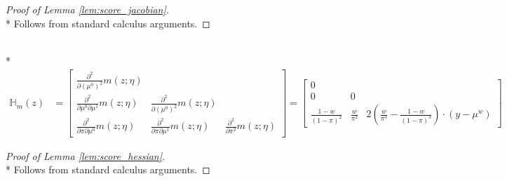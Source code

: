 \begin{proof}[Proof of Lemma \ref{lem:score_jacobian}]\mbox{}\\*
    Follows from standard calculus arguments.
\end{proof}

\begin{boxD}
    \begin{lem}\label{lem:score_hessian}\mbox{}\\*
    \begin{equation}
        \begin{aligned}
            \mathbb{H}_{m}(z)
            & = \begin{bmatrix}
                \frac{\partial^2}{\partial \left(\mu^{0}\right)^2} m\left(z; \eta\right)   & & \\
                \frac{\partial^2}{\partial \mu^{0} \partial \mu^{1}} m\left(z; \eta\right) & \frac{\partial^2}{\partial \left(\mu^{0}\right)^2} m\left(z; \eta\right) & \\
                \frac{\partial^2}{\partial \pi \partial \mu^{0}} m\left(z; \eta\right)     & \frac{\partial^2}{\partial \pi \partial \mu^{1}} m\left(z; \eta\right) & \frac{\partial^2}{\partial \pi^2} m\left(z; \eta\right)
            \end{bmatrix} 
            = \begin{bmatrix}
                0  & & \\
                0 & 0 & \\
                \frac{1-w}{\left(1-\pi\right)^{2}} & \frac{w}{\pi^2} & 2\left(\frac{w}{\pi^3} - \frac{1-w}{\left(1-\pi\right)^{3}}\right)  \cdot \left(y - \mu^{w}\right)
            \end{bmatrix}
        \end{aligned}
    \end{equation}
\end{lem}
\end{boxD}

\begin{proof}[Proof of Lemma \ref{lem:score_hessian}]\mbox{}\\*
    Follows from standard calculus arguments.
\end{proof}

